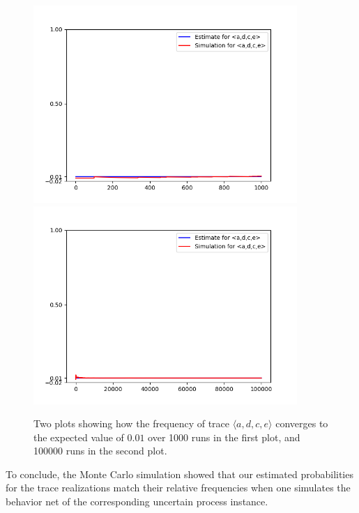\begin{figure}%
    \centering
    {{\includegraphics[width=10cm]{figures/adce1.png} }}%
    \qquad
    {{\includegraphics[width=10cm]{figures/adce100.png} }}%
    \caption{Two plots showing how the frequency of trace $\langle a,d,c,e \rangle$ converges to the expected value of $0.01$ over 1000 runs in the first plot, and 100000 runs in the second plot.}%
    \label{fig: adce}%
\end{figure}
%
%
%
%
%
To conclude, the Monte Carlo simulation showed that our estimated probabilities for the trace realizations match their relative frequencies when one simulates the behavior net of the corresponding uncertain process instance.

%
%
%
%
%
%
\newpage
